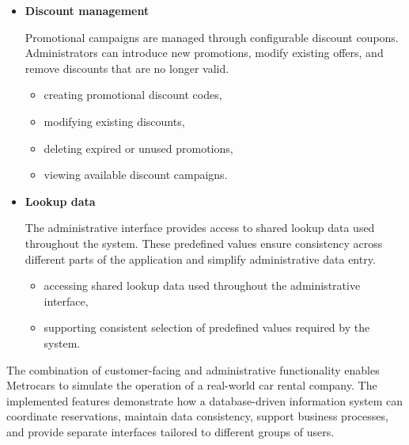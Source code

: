 \begin{itemize}
    \item \textbf{Discount management}

    Promotional campaigns are managed through configurable discount coupons. Administrators can introduce new promotions, modify existing offers, and remove discounts that are no longer valid.

    \begin{itemize}
        \item creating promotional discount codes,
        \item modifying existing discounts,
        \item deleting expired or unused promotions,
        \item viewing available discount campaigns.
    \end{itemize}

    \item \textbf{Lookup data}

    The administrative interface provides access to shared lookup data used throughout the system. These predefined values ensure consistency across different parts of the application and simplify administrative data entry.

    \begin{itemize}
        \item accessing shared lookup data used throughout the administrative interface,
        \item supporting consistent selection of predefined values required by the system.
    \end{itemize}

\end{itemize}

The combination of customer-facing and administrative functionality enables Metrocars to simulate the operation of a real-world car rental company. The implemented features demonstrate how a database-driven information system can coordinate reservations, maintain data consistency, support business processes, and provide separate interfaces tailored to different groups of users.